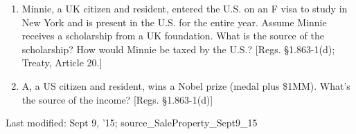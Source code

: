 \begin{select}
\begin{enumerate}
	\item Minnie, a UK citizen and resident, entered the U.S. on an F visa to study in New York and is present in the U.S. for the entire year.  Assume Minnie receives a scholarship from a UK foundation.  What is the source of the scholarship?  How would Minnie be taxed by the U.S.? [Regs. \S 1.863-1(d); Treaty, Article 20.]

	\item A, a US citizen and resident, wins a Nobel prize (medal plus \$1MM).  What's the source of the income?  [Regs. \S 1.863-1(d)]

			\end{enumerate}	
	\end{select}



\begin{framed}
Last modified: Sept 9, '15; source\_SaleProperty\_Sept9\_15
\end{framed}